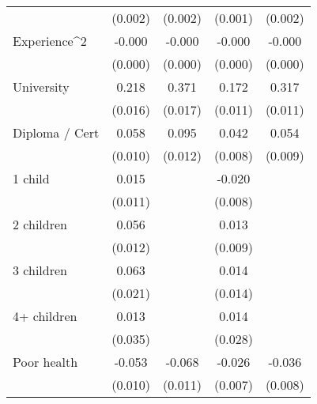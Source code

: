 {\begin{tabular}{l*{4}{c}}
                    &     (0.002)         &     (0.002)         &     (0.001)         &     (0.002)         \\
[1em]
Experience^{2}      &      -0.000\sym{***}&      -0.000\sym{***}&      -0.000\sym{***}&      -0.000\sym{***}\\
                    &     (0.000)         &     (0.000)         &     (0.000)         &     (0.000)         \\
[1em]
University          &       0.218\sym{***}&       0.371\sym{***}&       0.172\sym{***}&       0.317\sym{***}\\
                    &     (0.016)         &     (0.017)         &     (0.011)         &     (0.011)         \\
[1em]
Diploma / Cert      &       0.058\sym{***}&       0.095\sym{***}&       0.042\sym{***}&       0.054\sym{***}\\
                    &     (0.010)         &     (0.012)         &     (0.008)         &     (0.009)         \\
[1em]
1 child             &       0.015         &                     &      -0.020\sym{**} &                     \\
                    &     (0.011)         &                     &     (0.008)         &                     \\
[1em]
2 children          &       0.056\sym{***}&                     &       0.013         &                     \\
                    &     (0.012)         &                     &     (0.009)         &                     \\
[1em]
3 children          &       0.063\sym{**} &                     &       0.014         &                     \\
                    &     (0.021)         &                     &     (0.014)         &                     \\
[1em]
4+ children         &       0.013         &                     &       0.014         &                     \\
                    &     (0.035)         &                     &     (0.028)         &                     \\
[1em]
Poor health         &      -0.053\sym{***}&      -0.068\sym{***}&      -0.026\sym{***}&      -0.036\sym{***}\\
                    &     (0.010)         &     (0.011)         &     (0.007)         &     (0.008)         \\

\end{tabular}}
